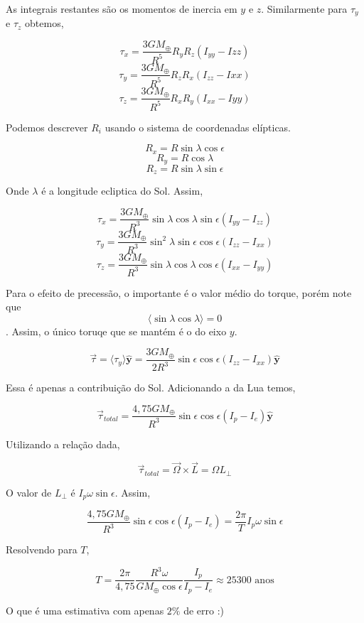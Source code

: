 \documentclass[11pt]{article}
\begin{document}
\begin{pproblem}
\begin{pssolution*}{}{}
\begin{alternativas}
            As integrais restantes são os momentos de inercia em \(y\) e \(z\). Similarmente para \(\tau_y\) e \(\tau_z\) obtemos, 

            \[\tau_x = \frac{3GM_\oplus}{R^5}R_yR_z (I_{yy}-I{zz})\]
            \[\tau_y = \frac{3GM_\oplus}{R^5}R_zR_x (I_{zz}-I{xx})\]
            \[\tau_z = \frac{3GM_\oplus}{R^5}R_xR_y (I_{xx}-I{yy})\]

            Podemos descrever \(R_i\) usando o sistema de coordenadas elípticas.

            \[R_x = R\sin\lambda \cos\epsilon\]
            \[R_y = R\cos\lambda\]
            \[R_z = R\sin\lambda\sin\epsilon\]

            Onde \(\lambda\) é a longitude ecliptica do Sol. Assim, 

            \[\tau_x = \frac{3GM_\oplus}{R^3}\sin\lambda\cos\lambda\sin\epsilon (I_{yy}-I_{zz})\]
            \[\tau_y = \frac{3GM_\oplus}{R^3} \sin^2\lambda\sin\epsilon\cos\epsilon(I_{zz}-I_{xx})\]
            \[\tau_z = \frac{3GM_\oplus}{R^3} \sin\lambda\cos\lambda\cos\epsilon(I_{xx}-I_{yy})\]

            Para o efeito de precessão, o importante é o valor médio do torque, porém note que \[\langle\sin\lambda\cos\lambda\rangle = 0\]. Assim, o único toruqe que se mantém é o do eixo \(y\).

            \[\vec\tau  = \langle\tau_y\rangle\mathbf{\hat{y}} = \frac{3GM_\oplus}{2R^3}\sin\epsilon\cos\epsilon (I_{zz}-I_{xx})\mathbf{\hat{y}}\]

            Essa é apenas a contribuição do Sol. Adicionando a da Lua temos, 

            \[\boxed{\vec\tau_{total} = \frac{4,75GM_\oplus}{R^3}\sin\epsilon\cos\epsilon (I_{p}-I_{e})\mathbf{\hat{y}}}\]

            \item Utilizando a relação dada, 
            
            \[\vec\tau_{total} = \vec\Omega \times \vec L = \Omega L_\perp\]

            O valor de \(L_\perp\) é \(I_p\omega\sin\epsilon\). Assim, 

            \[\frac{4,75GM_\oplus}{R^3}\sin\epsilon\cos\epsilon (I_{p}-I_{e}) = \frac{2\pi}{T}I_p\omega\sin\epsilon\]

            Resolvendo para \(T\), 

            \[\boxed{T = \frac{2\pi}{4,75}\frac{R^3\omega}{GM_\oplus\cos\epsilon}\frac{I_p}{I_p-I_e}\approx 25300\text{ anos}}\]

            O que é uma estimativa com apenas \(2\%\) de erro :)
        
        \end{alternativas}
    \end{pssolution*}
\end{pproblem}
    
\end{document}
